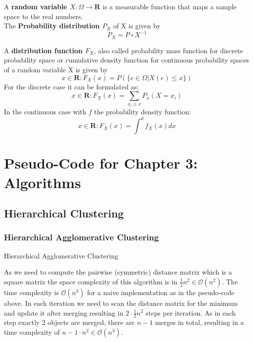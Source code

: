 A \textbf{random variable $X: \Omega \rightarrow \mathbf{R}$} is a measurable function that maps a sample space to the real numbers. \\
The \textbf{Probability distribution $P_X$} of X is given by \[ P_X = P \circ X^{-1} \]

A \textbf{distribution function $F_X$}, also called probability mass function for discrete probability space or cumulative density function for continuous probability spaces of a random variable X is given by \[ x \in \mathbf{R}: F_X(x) = P(\{e \in \Omega | X(e) \leq x\}) \]
For the discrete case it can be formulated as: \[ x \in \mathbf{R}: F_X(x) = \sum_{x_i \leq x} P_x (X = x_i) \]
In the continuous case with $f$ the probability density function: \[ x \in \mathbf{R}: F_X(x) = \int^d f_X(x) dx \]


\section{Pseudo-Code for Chapter 3: Algorithms}
\subsection{Hierarchical Clustering}
\subsubsection{Hierarchical Agglomerative Clustering}
\begin{algorithm}[htp]
    \hrulealg
\caption{Hierarchical Agglomerative Clustering}\label{agglo}
\end{algorithm}
As we need to compute the pairwise (symmetric) distance matrix which is a square matrix the space complexity of this algorithm is in $\frac{1}{2} n^2 \in \mathcal{O}(n^2)$. The time complexity is $\mathcal{O}(n^3)$ for a naive implementation as in the pseudo-code above. In each iteration we need to scan the distance matrix for the minimum and update it after merging resulting in  $2 \cdot \frac{1}{2} n^2$ steps per iteration. As in each step exactly 2 objects are merged, there are $n-1$ merges in total, resulting in a time complexity of $n - 1 \cdot n^2 \in \mathcal{O}(n^3)$.


